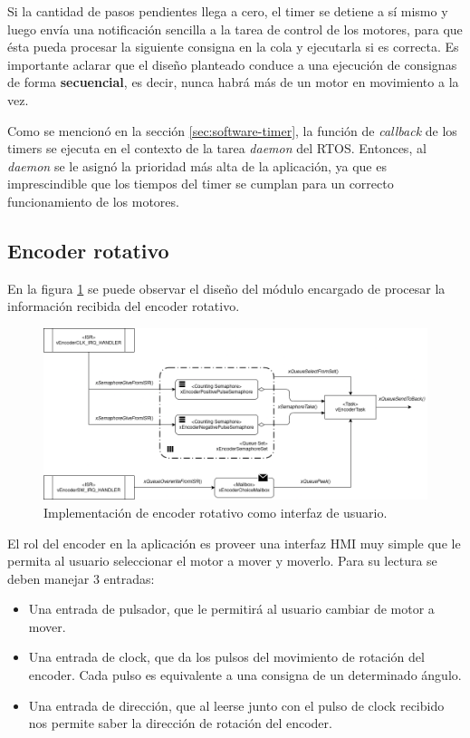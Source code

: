 \documentclass{IEEEtran}
\begin{document}
Si la cantidad de pasos pendientes llega a cero, el timer se detiene a sí mismo y luego envía una notificación sencilla a la tarea de control de los motores, para que ésta pueda procesar la siguiente consigna en la cola y ejecutarla si es correcta. Es importante aclarar que el diseño planteado conduce a una ejecución de consignas de forma \textbf{secuencial}, es decir, nunca habrá más de un motor en movimiento a la vez.

Como se mencionó en la sección \ref{sec:software-timer}, la función de \textit{callback} de los timers se ejecuta en el contexto de la tarea \textit{daemon} del RTOS. Entonces, al \textit{daemon} se le asignó la prioridad más alta de la aplicación, ya que es imprescindible que los tiempos del timer se cumplan para un correcto funcionamiento de los motores.

\subsection{Encoder rotativo}
\label{sec:encoder}

En la figura \ref{fig:diagrama-encoder} se puede observar el diseño del módulo encargado de procesar la información recibida del encoder rotativo.

\begin{figure}[ht]
    \centering
    \includegraphics[scale=0.5]{../diagrama_encoder.png}
    \caption{Implementación de encoder rotativo como interfaz de usuario.}
    \label{fig:diagrama-encoder}
\end{figure}

El rol del encoder en la aplicación es proveer una interfaz HMI muy simple que le permita al usuario seleccionar el motor a mover y moverlo. Para su lectura se deben manejar 3 entradas:

\begin{itemize}
    \item Una entrada de pulsador, que le permitirá al usuario cambiar de motor a mover.
    \item Una entrada de clock, que da los pulsos del movimiento de rotación del encoder. Cada pulso es equivalente a una consigna de un determinado ángulo.
    \item Una entrada de dirección, que al leerse junto con el pulso de clock recibido nos permite saber la dirección de rotación del encoder.
\end{itemize}
\end{document}
